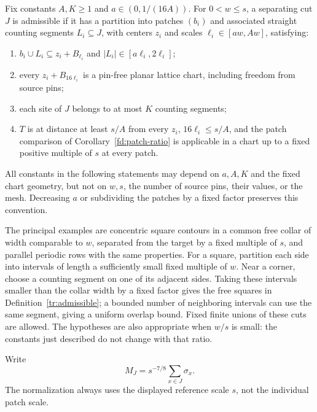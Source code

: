 \begin{definition}
\label{tr:admissible}
Fix constants $A,K\geq1$ and $a\in(0,1/(16A))$. For $0<w\leq s$, a separating cut
$J$ is admissible if it has a partition into patches $(b_i)$ and associated
straight counting segments $L_i\subseteq J$, with centers $z_i$ and
scales $\ell_i\in[aw,Aw]$, satisfying:
\begin{enumerate}
\item $b_i\cup L_i\subseteq z_i+B_{\ell_i}$ and
$|L_i|\in[a\ell_i,2\ell_i]$;
\item every $z_i+B_{16\ell_i}$ is a pin-free planar lattice chart,
including freedom from source pins;
\item each site of $J$ belongs to at most $K$ counting segments;
\item $T$ is at distance at least $s/A$ from every $z_i$,
$16\ell_i\leq s/A$, and the
patch comparison of Corollary~\ref{fd:patch-ratio} is applicable in a chart
up to a fixed positive multiple of $s$ at every patch.
\end{enumerate}
All constants in the following statements may depend on $a,A,K$ and the
fixed chart geometry, but not on $w,s$, the number of source pins, their
values, or the mesh. Decreasing $a$ or subdividing the patches by a fixed
factor preserves this convention.
\end{definition}

The principal examples are concentric square contours in a common free
collar of width comparable to $w$, separated from the target by a fixed
multiple of $s$, and parallel periodic rows with the same properties.
For a square, partition each side into intervals of length a sufficiently
small fixed multiple of $w$. Near a corner, choose a counting segment on
one of its adjacent sides. Taking these intervals smaller than the collar
width by a fixed factor gives the free squares in
Definition~\ref{tr:admissible}; a bounded number of neighboring intervals
can use the same segment, giving a uniform overlap bound. Fixed finite
unions of these cuts are allowed. The hypotheses are also appropriate
when $w/s$ is small: the constants just described do not change with that
ratio.

Write
\begin{equation}
\label{tr:magnetization-definition}
 M_J=s^{-7/8}\sum_{x\in J}\sigma_x.
\end{equation}
The normalization always uses the displayed reference scale $s$, not
the individual patch scale.

